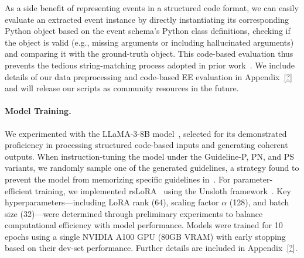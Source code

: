As a side benefit of representing events in a structured code format, we can easily evaluate an extracted event instance by directly instantiating its corresponding Python object based on the event schema's Python class definitions, checking if the object is valid (e.g., missing arguments or including hallucinated arguments) and comparing it with the ground-truth object. This code-based evaluation thus prevents the tedious string-matching process adopted in prior work~\cite{?}. We include details of our data preprocessing and code-based EE evaluation in Appendix~\ref{?} and will release our scripts as community resources in the future.

\paragraph{Model Training.} We experimented with the LLaMA-3-8B model~\cite{?}, selected for its demonstrated proficiency in processing structured code-based inputs and generating coherent outputs. When instruction-tuning the model under the Guideline-P, PN, and PS variants, we randomly sample one of the generated guidelines, a strategy found to prevent the model from memorizing specific guidelines in~\citet{sainz2024gollie}.
For parameter-efficient training, we implemented rsLoRA~\cite{RSLORA} using the Unsloth framework~\cite{unsloth}. Key hyperparameters—including LoRA rank (64), scaling factor $\alpha$ (128), and batch size (32)—were determined through preliminary experiments to balance computational efficiency with model performance. Models were trained for 10 epochs using a single NVIDIA A100 GPU (80GB VRAM) with early stopping based on their dev-set performance. Further details are included in Appendix~\ref{?}.

